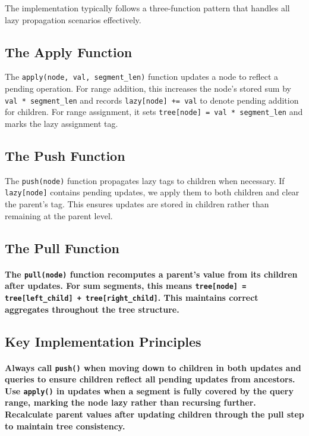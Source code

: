 The implementation typically follows a three-function pattern that handles all lazy propagation scenarios effectively.
\subsection{The Apply Function}
The \texttt{apply(node, val, segment\_len)} function updates a node to reflect a pending operation. For range addition, this increases the node's stored sum by \texttt{val * segment\_len} and records \texttt{lazy[node] += val} to denote pending addition for children. For range assignment, it sets \texttt{tree[node] = val * segment\_len} and marks the lazy assignment tag.

\subsection{The Push Function}
The \texttt{push(node)} function propagates lazy tags to children when necessary. If \texttt{lazy[node]} contains pending updates, we apply them to both children and clear the parent's tag. This ensures updates are stored in children rather than remaining at the parent level.
\subsection{The Pull Function}
\paragraph{The \texttt{pull(node)} function recomputes a parent's value from its children after updates. For sum segments, this means \texttt{tree[node] = tree[left\_child] + tree[right\_child]}. This maintains correct aggregates throughout the tree structure.}

\subsection{Key Implementation Principles}
\paragraph{Always call \texttt{push()} when moving down to children in both updates and queries to ensure children reflect all pending updates from ancestors. Use \texttt{apply()} in updates when a segment is fully covered by the query range, marking the node lazy rather than recursing further. Recalculate parent values after updating children through the pull step to maintain tree consistency.}
